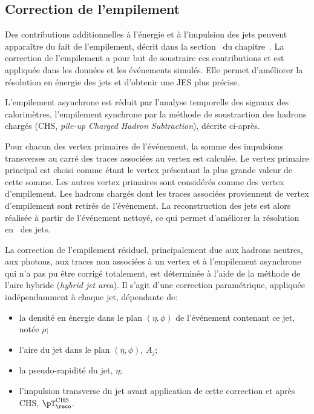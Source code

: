 \subsection{Correction de l'empilement}\label{chapter-JERC-section-CMS-subsec-PU}
Des contributions additionnelles à l'énergie et à l'impulsion des jets peuvent apparaître du fait de l'empilement, décrit dans la section~ du chapitre~.
La correction de l'empilement a pour but de soustraire ces contributions et est appliquée dans les données et les événements simulés.
Elle permet d'améliorer la résolution en énergie des jets et d'obtenir une JES plus précise.
\par L'empilement asynchrone est réduit par l'analyse temporelle des signaux des calorimètres,
l'empilement synchrone par la méthode de soustraction des hadrons chargés (CHS, \emph{pile-up Charged Hadron Subtraction}), décrite ci-après.
\par Pour chacun des vertex primaires de l'événement, la somme des impulsions transverses au carré des traces associées au vertex est calculée.
Le vertex primaire principal est choisi comme étant le vertex présentant la plus grande valeur de cette somme.
Les autres vertex primaires sont considérés comme des vertex d'empilement.
Les hadrons chargés dont les traces associées proviennent de vertex d'empilement sont retirés de l'événement.
La reconstruction des jets est alors réalisée à partir de l'événement nettoyé, ce qui permet d'améliorer la résolution en \pT\ des jets.
\par La correction de l'empilement résiduel, principalement due aux hadrons neutres, aux photons, aux traces non associées à un vertex et à l'empilement asynchrone qui n'a pas pu être corrigé totalement, est déterminée à l'aide de la méthode de l'aire hybride (\emph{hybrid jet area}).
Il s'agit d'une correction paramétrique, appliquée indépendamment à chaque jet, dépendante de:
\begin{itemize}
\item la densité en énergie dans le plan $(\eta, \phi)$ de l'événement contenant ce jet, notée $\rho$;
\item l'aire du jet dans le plan $(\eta, \phi)$, $A_j$;
\item la pseudo-rapidité du jet, $\eta$;
\item l'impulsion transverse du jet avant application de cette correction et après CHS, $\pT_\reco^\text{CHS}$.
\end{itemize}
